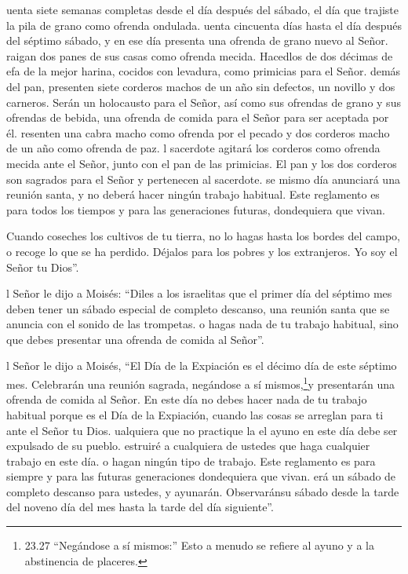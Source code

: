 uenta siete semanas completas desde el día después del
sábado, el día que trajiste la pila de grano como ofrenda ondulada.
 uenta cincuenta días hasta el día después del séptimo
sábado, y en ese día presenta una ofrenda de grano nuevo al Señor.
 raigan dos panes de sus casas como ofrenda mecida.
Hacedlos de dos décimas de efa de la mejor harina, cocidos con levadura,
como primicias para el Señor.  demás del pan, presenten
siete corderos machos de un año sin defectos, un novillo y dos carneros.
Serán un holocausto para el Señor, así como sus ofrendas de grano y sus
ofrendas de bebida, una ofrenda de comida para el Señor para ser
aceptada por él.  resenten una cabra macho como ofrenda por
el pecado y dos corderos macho de un año como ofrenda de paz.
 l sacerdote agitará los corderos como ofrenda mecida ante
el Señor, junto con el pan de las primicias. El pan y los dos corderos
son sagrados para el Señor y pertenecen al sacerdote.  se
mismo día anunciará una reunión santa, y no deberá hacer ningún trabajo
habitual. Este reglamento es para todos los tiempos y para las
generaciones futuras, dondequiera que vivan.

 Cuando coseches los cultivos de tu tierra, no lo hagas
hasta los bordes del campo, o recoge lo que se ha perdido. Déjalos para
los pobres y los extranjeros. Yo soy el Señor tu Dios''.

 l Señor le dijo a Moisés:  ``Diles a los
israelitas que el primer día del séptimo mes deben tener un sábado
especial de completo descanso, una reunión santa que se anuncia con el
sonido de las trompetas.  o hagas nada de tu trabajo
habitual, sino que debes presentar una ofrenda de comida al Señor''.

 l Señor le dijo a Moisés,  ``El Día de la
Expiación es el décimo día de este séptimo mes. Celebrarán una reunión
sagrada, negándose a sí mismos,\footnote{23.27 ``Negándose a sí
  mismos:'' Esto a menudo se refiere al ayuno y a la abstinencia de
  placeres.}y presentarán una ofrenda de comida al Señor. 
En este día no debes hacer nada de tu trabajo habitual porque es el Día
de la Expiación, cuando las cosas se arreglan para ti ante el Señor tu
Dios.  ualquiera que no practique la el ayuno en este día
debe ser expulsado de su pueblo.  estruiré a cualquiera de
ustedes que haga cualquier trabajo en este día.  o hagan
ningún tipo de trabajo. Este reglamento es para siempre y para las
futuras generaciones dondequiera que vivan.  erá un sábado
de completo descanso para ustedes, y ayunarán. Observaránsu sábado desde
la tarde del noveno día del mes hasta la tarde del día siguiente''.

